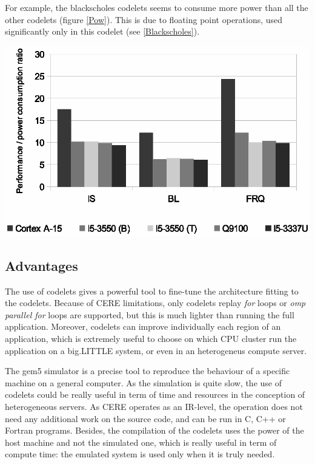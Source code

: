 \documentclass{article}
\newenvironment{Figure}
  {\par\medskip\noindent\center\minipage{0.9\linewidth}}
  {\endminipage\par\bigskip\medskip}
\begin{document}
\begin{multicols}{2}
For example, the blackscholes codelets seems to consume more power than all the other codelets (figure \ref{Pow}). This is due to floating point operations, used significantly only in this codelet (see \ref{Blackscholes}).


\begin{Figure}
\centering
\includegraphics[width=\linewidth]{Ratio.eps}
\end{Figure}

\subsection{Advantages}
The use of codelets gives a powerful tool to fine-tune the architecture fitting to the codelets. Because of CERE limitations, only codelets replay \textit{for} loops or \textit{omp parallel for} loops are supported, but this is much lighter than running the full application. Moreover, codelets can improve individually each region of an application, which is extremely useful to choose on which CPU cluster run the application on a big.LITTLE system, or even in an heterogeneus compute server.

The gem5 simulator is a precise tool to reproduce the behaviour of a specific machine on a general computer. As the simulation is quite slow, the use of codelets could be really useful in term of time and resources in the conception of heterogeneous servers. As CERE operates as an IR-level, the operation does not need any additional work on the source code, and can be run in C, C++ or Fortran programs. Besides, the compilation of the codelets uses the power of the host machine and not the simulated one, which is really useful in term of compute time: the emulated system is used only when it is truly needed.


\end{multicols}
\end{document}
